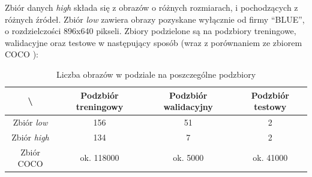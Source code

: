 Zbiór danych \textit{high} składa się z obrazów o różnych rozmiarach, i pochodzących z różnych źródeł.
Zbiór \textit{low} zawiera obrazy pozyskane wyłącznie od firmy ``BLUE'', o rozdzielczości 896x640 pikseli.
Zbiory podzielone są na podzbiory treningowe, walidacyjne oraz testowe w następujący sposób (wraz z porównaniem ze zbiorem COCO \cite{coco}):

\begin{table}[!h]
	\centering
	\caption{Liczba obrazów w podziale na poszczególne podzbiory}
	\vspace{6pt}
	{\footnotesize
		\begin{tabular}{|c|c|c|c|}
			\hline \textbackslash & Podzbiór treningowy & Podzbiór walidacyjny & Podzbiór testowy \\
      \hline Zbiór \textit{low} & 156 & 51 & 2 \\
      \hline Zbiór \textit{high} & 134 & 7 & 2 \\
      \hline Zbiór COCO & ok. 118000 & ok. 5000 & ok. 41000 \\
      \hline
		\end{tabular}
	}
	\vspace{0pt}
\end{table}

